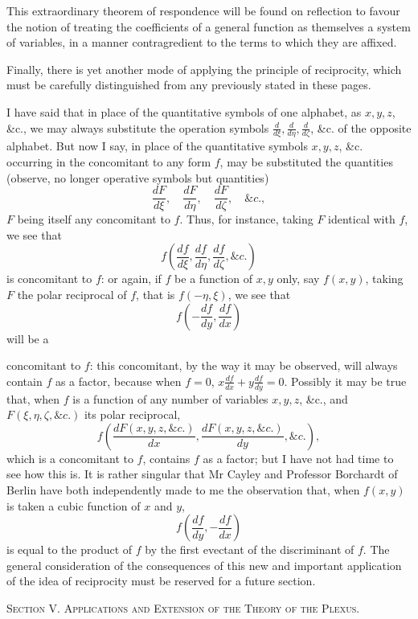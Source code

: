 \documentclass[11pt]{article}
\newcommand{\subpaperhead}[1]{\begin{center}{\large\scshape #1}\end{center}}
\newcommand{\sourcepage}[1]{\marginpar{\scriptsize p.~#1}}
\begin{document}
{{This extraordinary theorem of respondence will be found on reflection to favour the notion of treating the coefficients of a general function as themselves a system of variables, in a manner contragredient to the terms to which they are affixed.

Finally, there is yet another mode of applying the principle of reciprocity, which must be carefully distinguished from any previously stated in these pages.

I have said that in place of the quantitative symbols of one alphabet, as $x,y,z$, \&c., we may always substitute the operation symbols $\frac{d}{d\xi},\frac{d}{d\eta},\frac{d}{d\zeta}$, \&c. of the opposite alphabet. But now I say, in place of the quantitative symbols $x,y,z$, \&c. occurring in the concomitant to any form $f$, may be substituted the quantities (observe, no longer operative symbols but quantities)
\[
\frac{dF}{d\xi},\quad \frac{dF}{d\eta},\quad \frac{dF}{d\zeta},\quad \&c.,
\]
$F$ being itself any concomitant to $f$. Thus, for instance, taking $F$ identical with $f$, we see that
\[
f\left(\frac{df}{d\xi},\frac{df}{d\eta},\frac{df}{d\zeta},\&c.\right)
\]
is concomitant to $f$: or again, if $f$ be a function of $x,y$ only, say $f(x,y)$, taking $F$ the polar reciprocal of $f$, that is $f(-\eta,\xi)$, we see that
\[
f\left(-\frac{df}{dy},\frac{df}{dx}\right)
\]
will be a

\sourcepage{342}
concomitant to $f$: this concomitant, by the way it may be observed, will always contain $f$ as a factor, because when $f=0$, $x\frac{df}{dx}+y\frac{df}{dy}=0$. Possibly it may be true that, when $f$ is a function of any number of variables $x,y,z$, \&c., and $F(\xi,\eta,\zeta,\&c.)$ its polar reciprocal,
\[
f\left(\frac{dF(x,y,z,\&c.)}{dx},\frac{dF(x,y,z,\&c.)}{dy},\&c.\right),
\]
which is a concomitant to $f$, contains $f$ as a factor; but I have not had time to see how this is. It is rather singular that Mr Cayley and Professor Borchardt of Berlin have both independently made to me the observation that, when $f(x,y)$ is taken a cubic function of $x$ and $y$,
\[
f\left(\frac{df}{dy},-\frac{df}{dx}\right)
\]
is equal to the product of $f$ by the first evectant of the discriminant of $f$. The general consideration of the consequences of this new and important application of the idea of reciprocity must be reserved for a future section.

\subpaperhead{Section V. \quad Applications and Extension of the Theory of the Plexus.}

}}
\end{document}
